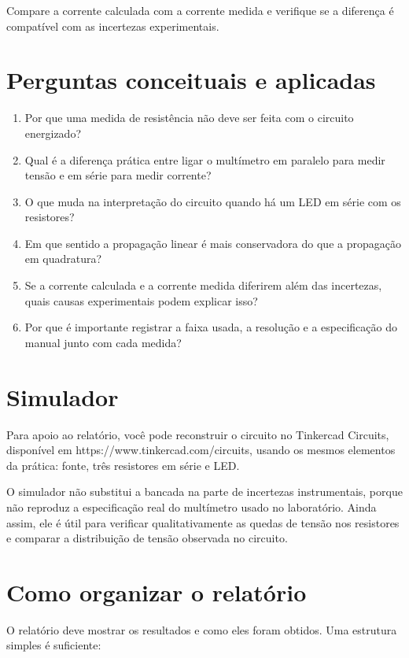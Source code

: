 \documentclass[12pt,a4paper]{article}
\begin{document}
Compare a corrente calculada com a corrente medida e verifique se a diferença é compatível com as incertezas experimentais.

\section{Perguntas conceituais e aplicadas}

\begin{enumerate}
  \item Por que uma medida de resistência não deve ser feita com o circuito energizado?
  \item Qual é a diferença prática entre ligar o multímetro em paralelo para medir tensão e em série para medir corrente?
  \item O que muda na interpretação do circuito quando há um LED em série com os resistores?
  \item Em que sentido a propagação linear é mais conservadora do que a propagação em quadratura?
  \item Se a corrente calculada e a corrente medida diferirem além das incertezas, quais causas experimentais podem explicar isso?
  \item Por que é importante registrar a faixa usada, a resolução e a especificação do manual junto com cada medida?
\end{enumerate}

\section{Simulador}

Para apoio ao relatório, você pode reconstruir o circuito no Tinkercad Circuits, disponível em
https://www.tinkercad.com/circuits, usando os mesmos elementos da prática: fonte, três resistores em série e LED.

O simulador não substitui a bancada na parte de incertezas instrumentais, porque não reproduz a especificação real do multímetro
usado no laboratório. Ainda assim, ele é útil para verificar qualitativamente as quedas de tensão nos resistores e comparar a
distribuição de tensão observada no circuito.

\section{Como organizar o relatório}

O relatório deve mostrar os resultados e como eles foram obtidos. Uma estrutura simples é suficiente:
\end{document}
